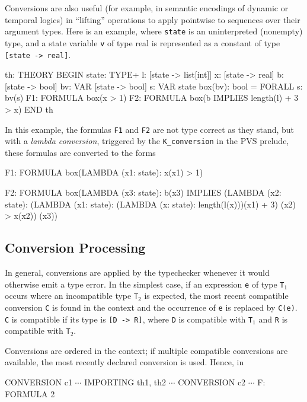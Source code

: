 Conversions are also useful (for example, in semantic encodings of dynamic
or temporal logics) in ``lifting'' operations to apply pointwise to
sequences over their argument types.  Here is an example, where
\texttt{state} is an uninterpreted (nonempty) type, and a state variable
\texttt{v} of type real is represented as a constant of type
\texttt{[state -> real]}.  
\begin{pvsex}
  th: THEORY
   BEGIN
    state: TYPE+
    l: [state -> list[int]]
    x: [state -> real]
    b: [state -> bool]
    bv: VAR [state -> bool]
    s: VAR state
    box(bv): bool = FORALL s: bv(s)
    F1: FORMULA box(x > 1)
    F2: FORMULA box(b IMPLIES length(l) + 3 > x)
   END th
\end{pvsex}
In this example, the formulas \texttt{F1} and \texttt{F2} are not type
correct as they stand, but with a \emph{lambda conversion}, triggered by
the \texttt{K\_conversion} in the PVS prelude, these formulas
are converted to the forms
\begin{pvsex}
  F1: FORMULA box(LAMBDA (x1: state): x(x1) > 1)
  
  F2: FORMULA
    box(LAMBDA (x3: state):
          b(x3) IMPLIES
           (LAMBDA (x2: state):
              (LAMBDA (x1: state): (LAMBDA (x: state): length(l(x)))(x1) + 3)
                  (x2)
               > x(x2))
               (x3))
\end{pvsex}


\subsection{Conversion Processing}

In general, conversions are applied by the typechecker whenever it would
otherwise emit a type error.  In the simplest case, if an expression
\texttt{e} of type \texttt{T$_1$} occurs where an incompatible type
\texttt{T$_2$} is expected, the most recent compatible conversion
\texttt{C} is found in the context and the occurrence of \texttt{e} is
replaced by \texttt{C(e)}.  \texttt{C} is compatible if its type is
\texttt{[D -> R]}, where \texttt{D} is compatible with \texttt{T$_1$} and
\texttt{R} is compatible with \texttt{T$_2$}.

Conversions are ordered in the context; if multiple compatible conversions
are available,  the most recently declared conversion is used.  Hence, in

\begin{pvsex}
  CONVERSION c1
  \(\cdots\)
  IMPORTING th1, th2
  \(\cdots\)
  CONVERSION c2
  \(\cdots\)
  F: FORMULA 2
\end{pvsex}

